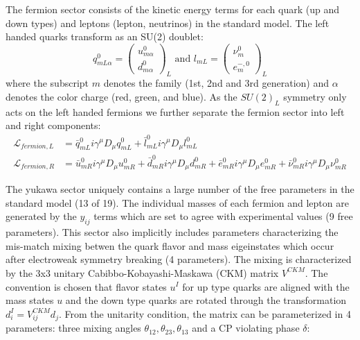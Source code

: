 The fermion sector consists of the kinetic energy terms for each quark (up and down types) and leptons (lepton, neutrinos) in the standard model.
The left handed quarks transform as an SU(2) doublet:
\begin{equation}
q^0_{mL\alpha} = \left( \begin{array}{c} u_{m\alpha}^0  \\ d_{m\alpha}^0 \end{array} \right)_L \text{ and } l_{mL} = \left( \begin{array}{c} \nu_{m}^0  \\ e^{-,0}_{m} \end{array} \right)_L 
\end{equation}
where the subscript $m$ denotes the family (1st, 2nd and 3rd generation) and $\alpha$ denotes the color charge (red, green, and blue).
As the $SU(2)_L$ symmetry only acts on the left handed fermions we further separate the fermion sector into left and right components:
\begin{align*}
\mathcal{L}_{fermion,L} &= \bar{q}^0_{mL} i \gamma^\mu D_\mu q^0_{mL} + \bar{l}^0_{mL} i \gamma^\mu D_\mu l^0_{mL}\\
\mathcal{L}_{fermion,R} &=  \bar{u}^0_{mR} i \gamma^\mu D_\mu u^0_{mR} 
+ \bar{d}^0_{mR} i \gamma^\mu D_\mu d^0_{mR} + \bar{e}^0_{mR} i \gamma^\mu D_\mu e^0_{mR} + \bar{\nu}^0_{mR} i \gamma^\mu D_\mu \nu^0_{mR}
\end{align*}

The yukawa sector uniquely contains a large number of the free parameters in the standard model (13 of 19). 
The individual masses of each fermion and lepton are generated by the $y_{ij}$
terms which are set to agree with experimental values (9 free parameters). This sector also implicitly
 includes parameters characterizing the mis-match 
mixing betwen the quark flavor and mass eigeinstates which occur after electroweak 
symmetry breaking (4 parameters). The mixing is characterized by  the 3x3 unitary Cabibbo-Kobayashi-Maskawa (CKM) matrix $V^{CKM}$. 
The convention is chosen that flavor states $u^I$ for up type quarks are aligned with the mass states $u$ and the down type quarks are
rotated through the transformation $d^I_i = V^{CKM}_{ij} d_{j}$. From the unitarity condition, the matrix can be parameterized in 4 parameters: three mixing angles $\theta_{12}, \theta_{23}, \theta_{13}$ and a CP violating phase $\delta$:

